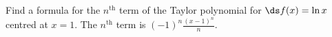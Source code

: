{Find a formula for the $n^\text{th}$ term of the Taylor polynomial for $\ds f(x)=\ln x$ centred at $x=1$.
}
{The $n^\text{th}$ term is $(-1)^n\frac{(x-1)^n}{n}$.
}
